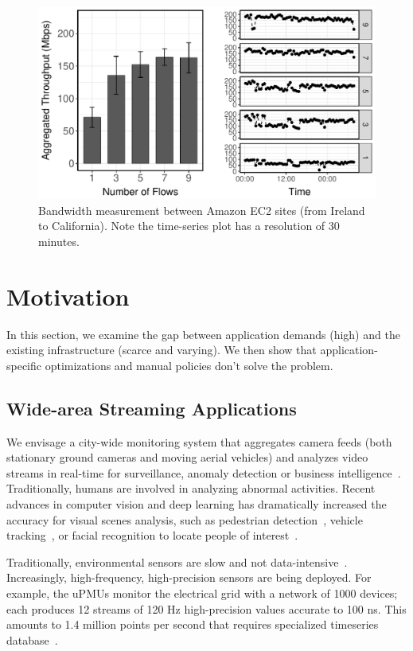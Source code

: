 \begin{figure}
  \centering
  \includegraphics[width=.9\linewidth]{figures/motiv-aws.pdf}
  \caption{Bandwidth measurement between Amazon EC2 sites (from Ireland to
    California). Note the time-series plot has a resolution of 30 minutes.}
  \label{fig:bw}
\end{figure}

\section{Motivation}
\label{sec:motivation}

In this section, we examine the gap between application demands (high) and the
existing infrastructure (scarce and varying). We then show that
application-specific optimizations and manual policies don't solve the problem.

\subsection{Wide-area Streaming Applications}
\label{sec:wide-area-streaming}

 We envisage a city-wide monitoring system that
aggregates camera feeds (both stationary ground cameras and moving aerial
vehicles) and analyzes video streams in real-time for surveillance, anomaly
detection or business intelligence~\cite{oh2011large}. Traditionally, humans are
involved in analyzing abnormal activities. Recent advances in computer vision
and deep learning has dramatically increased the accuracy for visual scenes
analysis, such as pedestrian detection~\cite{dollar2012pedestrian}, vehicle
tracking~\cite{coifman1998real}, or facial recognition to locate people of
interest~\cite{parkhi2015deep, Lu:2015:SHF:2888116.2888245}.

 Traditionally, environmental sensors are slow
and not data-intensive~\cite{atzori2010internet}. Increasingly, high-frequency,
high-precision sensors are being deployed. For example, the uPMUs monitor the
electrical grid with a network of 1000 devices; each produces 12 streams of 120
Hz high-precision values accurate to 100 ns. This amounts to 1.4 million points
per second that requires specialized timeseries
database~\cite{andersen2016btrdb}.

